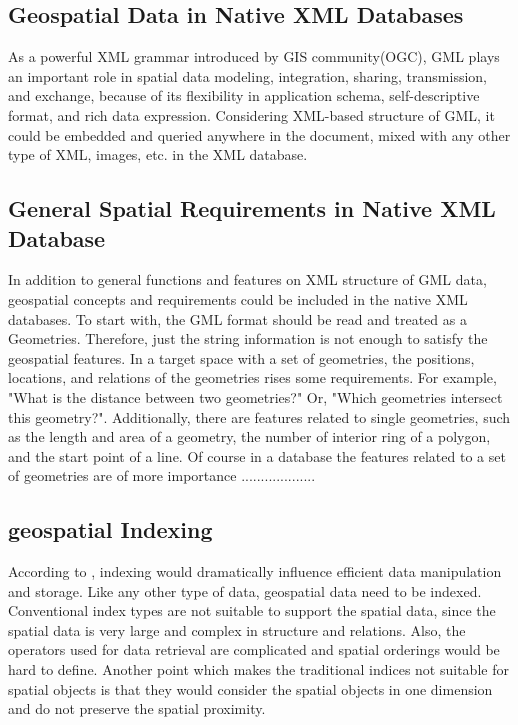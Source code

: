 \documentclass[a4paper,12pt]{article}
\begin{document}
\subsection{Geospatial Data in Native XML Databases}
As a powerful XML grammar introduced by GIS community(OGC), GML plays an important role in spatial data modeling, integration, sharing, transmission, and exchange, because of its flexibility in application schema, self-descriptive format, and rich data expression. Considering XML-based structure of GML, it could be embedded and queried anywhere in the document, mixed with any other type of XML, images, etc. in the XML database. 

\subsection{General Spatial Requirements in Native XML Database}
In addition to general functions and features on XML structure of GML data, geospatial concepts and requirements could be included in the native XML databases. To start with, the GML format should be read and treated as a Geometries. Therefore, just the string information is not enough to satisfy the geospatial features. In a target space with a set of geometries, the positions, locations, and relations of the geometries rises some requirements. For example, "What is the distance between two geometries?" Or, "Which geometries intersect this geometry?". Additionally, there are features related to single geometries, such as the length and area of a geometry, the number of interior ring of a polygon, and the start point of a line. Of course in a database the features related to a set of geometries are of more importance ...................


\subsection{geospatial Indexing}
\label{geospatialindex}
According to \cite{survey}, indexing would dramatically influence efficient data manipulation and storage. Like any other type of data, geospatial data need to be indexed. Conventional index types are not suitable to support the spatial data, since the spatial data is very large and complex in structure and relations. Also, the operators used for data retrieval are complicated and spatial orderings would be hard to define. Another point which makes the traditional indices not suitable for spatial objects is that they would consider the spatial objects in one dimension and do not preserve the spatial proximity.
\end{document}
